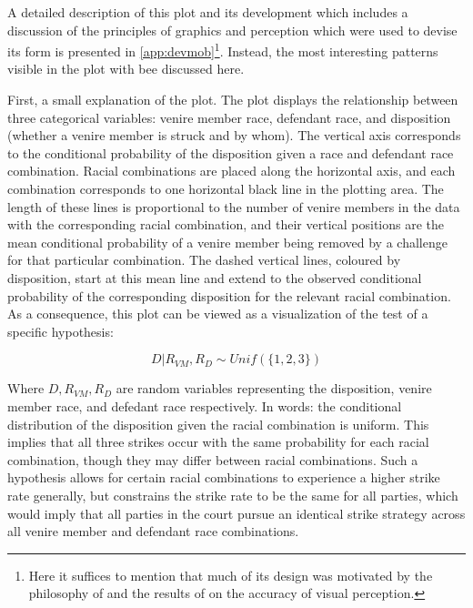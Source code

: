 A detailed description of this plot and its development which includes a discussion of the principles of graphics and perception
which were used to devise its form is presented in \ref{app:devmob}\footnote{Here it suffices to mention that much of its design
  was motivated by the philosophy of \cite{VisualDisplayQuant} and the results of \cite{cleveland1987} on the accuracy of visual
  perception.}. Instead, the most interesting patterns visible in the plot with bee discussed here.

First, a small explanation of the plot. The plot displays the relationship between three categorical variables: venire member
race, defendant race, and disposition (whether a venire member is struck and by whom). The vertical axis corresponds to the
conditional probability of the disposition given a race and defendant race combination. Racial combinations are placed along the
horizontal axis, and each combination corresponds to one horizontal black line in the plotting area. The length of these lines is
proportional to the number of venire members in the data with the corresponding racial combination, and their vertical positions
are the mean conditional probability of a venire member being removed by a challenge for that particular combination. The dashed
vertical lines, coloured by disposition, start at this mean line and extend to the observed conditional probability of the
corresponding disposition for the relevant racial combination. As a consequence, this plot can be viewed as a visualization of the
test of a specific hypothesis:

\begin{equation}
  \label{eq:vishyp}
  D | R_{VM}, R_{D} \sim Unif(\{1,2,3\})
\end{equation}

Where $D, R_{VM}, R_D$ are random variables representing the disposition, venire member race, and defedant race respectively. In
words: the conditional distribution of the disposition given the racial combination is uniform. This implies that all
three strikes occur with the same probability for each racial combination, though they may differ between racial
combinations. Such a hypothesis allows for certain racial combinations to experience a higher strike rate generally, but
constrains the strike rate to be the same for all parties, which would imply that all parties in the court pursue an identical
strike strategy across all venire member and defendant race combinations.

